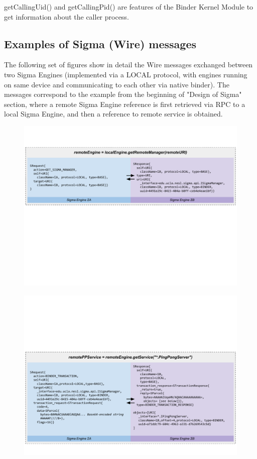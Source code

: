 \documentclass[prodmode]{acmlarge}
\begin{document}
getCallingUid() and getCallingPid() are features of the Binder Kernel Module to get information about the caller process.


\subsection{Examples of Sigma (Wire) messages}
\label{app:WireExchange}
The following set of figures show in detail the Wire messages exchanged between two Sigma Engines (implemented via a LOCAL protocol, with engines running on same device and communicating to each other via native binder). The messages correspond to the example from the beginning of "Design of Sigma" section, where a remote Sigma Engine reference is first retrieved via RPC to a local Sigma Engine, and then a reference to remote service is obtained.
\begin{figure}[h!]
\centering
\includegraphics[width=\textwidth]{drawings/WireExchange1.pdf}
\end{figure}
\begin{figure}[h!]
\centering
\includegraphics[width=\textwidth]{drawings/WireExchange2.pdf}
\end{figure}
\end{document}
